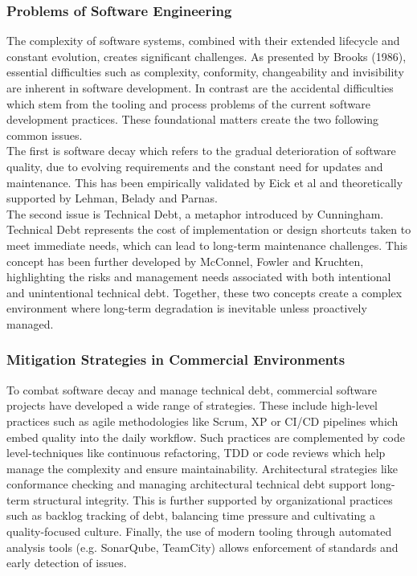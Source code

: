\subsubsection{Problems of Software Engineering}
The complexity of software systems, combined with their extended lifecycle and constant evolution, creates significant challenges. As presented by Brooks (1986), essential difficulties such as complexity, conformity, changeability and invisibility are inherent in software development.
In contrast are the accidental difficulties which stem from the tooling and process problems of the current software development practices.
These foundational matters create the two following common issues.\\

The first is software decay which refers to the gradual deterioration of software quality, due to evolving requirements and the constant need for updates and maintenance. This has been empirically validated by Eick et al and theoretically supported by Lehman, Belady and Parnas.\\
The second issue is Technical Debt, a metaphor introduced by Cunningham. Technical Debt represents the cost of implementation or design shortcuts taken to meet immediate needs, which can lead to long-term maintenance challenges. This concept has been further developed by McConnel, Fowler and Kruchten, highlighting the risks and management needs
associated with both intentional and unintentional technical debt. Together, these two concepts create a complex environment where long-term degradation is inevitable unless proactively managed.\\

\subsubsection{Mitigation Strategies in Commercial Environments}
To combat software decay and manage technical debt, commercial software projects have developed a wide range of strategies. These include high-level practices such as agile methodologies like Scrum, \ac{XP} or CI/CD pipelines which embed quality into the daily workflow.
Such practices are complemented by code level-techniques like continuous refactoring, \ac{TDD} or code reviews which help manage the complexity and ensure maintainability. Architectural strategies like conformance checking and managing architectural technical debt support long-term structural integrity.
This is further supported by organizational practices such as backlog tracking of debt, balancing time pressure and cultivating a quality-focused culture. Finally, the use of modern tooling through automated analysis tools (e.g. SonarQube, TeamCity) allows enforcement of standards and early detection of issues.\\

